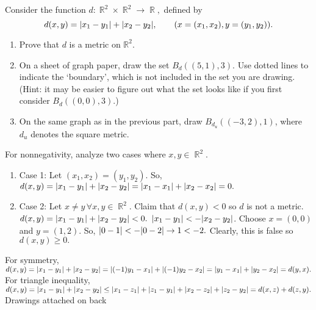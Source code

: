 \documentclass[12pt,letterpaper,boxed]{hmcpset}
\DeclarePairedDelimiter\abs{\lvert}{\rvert}
\DeclareMathOperator{\R}{\mathbb{R}}
\begin{document}
\begin{problem}[Exercise 2.6.]
Consider the function $d: \R^{2} \times \R^{2} \rightarrow \R,$ defined by $$d(x, y) = \abs{x_1 - y_1} + \abs{x_2 - y_2}, \quad \quad (x = (x_1, x_2), y = (y_1, y_2)). $$
\vspace{-2mm}
\begin{enumerate}
	\itemsep0em
	\item Prove that $d$ is a metric on $\mathbb{R}^{2}.$
	\item On a sheet of graph paper, draw the set $B_{d}((5, 1), 3).$ Use dotted lines to indicate the ‘boundary’,
which is not included in the set you are drawing. (Hint: it may be easier to figure out what the
set looks like if you first consider $B_{d}((0, 0), 3).$)
	\item On the same graph as in the previous part, draw $B_{d_{u}}((-3, 2),1)$, where $d_{u}$ denotes the square metric.
\end{enumerate}
\end{problem}
\begin{solution}
For nonnegativity, analyze two cases where $x, y \in \R^{2}$.
\begin{enumerate}
	\itemsep0em
	\item Case 1: Let  $(x_1, x_2) = (y_1, y_2)$. So, $d(x, y) = \abs{x_1 - y_1} + \abs{x_2 - y_2} = \abs{x_1 - x_1} + \abs{x_2 - x_2} = 0.$ 
	\item Case 2: Let $x \neq y \, \forall x, y \in \R^{2}.$ Claim that $d(x, y) < 0$ so $d$ is not a metric. $d(x, y) = \abs{x_1 - y_1} + \abs{x_2 - y_2} < 0.$ $\abs{x_1 - y_1} < -\abs{x_2 - y_2}$. Choose $x = (0, 0)$ and $y = (1, 2)$. So, $\abs{0 - 1} < -\abs{0 - 2} \rightarrow 1 < -2.$ Clearly, this is false so $d(x,y) \ge 0.$ 
\end{enumerate}

For symmetry, $d(x, y) = \abs{x_1 - y_1} + \abs{x_2 - y_2} = \abs{(-1)y_1 - x_1} + \abs{(-1)y_2 - x_2} = \abs{y_1 - x_1} + \abs{y_2 - x_2} = d(y,x).$ \\
For triangle inequality, $d(x,y) = \abs{x_1 - y_1} + \abs{x_2 - y_2} \leq \abs{x_1 - z_1} + \abs{z_1 - y_1} + \abs{x_2 - z_2} + \abs{z_2 - y_2} = d(x, z) + d(z, y).$ 
Drawings attached on back
\end{solution}
\end{document}
